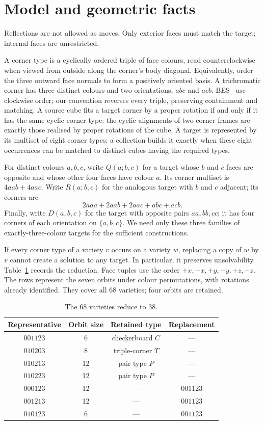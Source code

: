 \documentclass[11pt]{article}
\theoremstyle{remark}
\begin{document}
\section{Model and geometric facts}
Reflections are not allowed as moves. Only exterior faces must match the
target; internal faces are unrestricted.

A corner type is a cyclically ordered triple of face colours, read
counterclockwise when viewed from outside along the corner's body diagonal.
Equivalently, order the three outward face normals to form a positively
oriented basis. A trichromatic corner has three distinct colours and two
orientations, $abc$ and $acb$. BES~\cite[Section 2]{BES} use clockwise order; our convention
reverses every triple, preserving containment and matching. A source cube
fits a target corner by a proper rotation if and
only if it has the same cyclic corner type: the cyclic alignments of two
corner frames are exactly those realised by proper rotations of the cube.
A target is represented by its
multiset of eight corner types: a collection builds it exactly when these
eight occurrences can be matched to distinct cubes having the required types.

For distinct colours $a,b,c$, write $Q(a;b,c)$ for a target whose $b$ and $c$
faces are opposite and whose other four faces have colour $a$. Its corner multiset is
$4aab+4aac$. Write $R(a;b,c)$ for the analogous target with $b$ and $c$
adjacent; its corners are
\[
  2aaa+2aab+2aac+abc+acb.
\]
Finally, write $D(a,b,c)$ for the target with opposite pairs $aa,bb,cc$;
it has four corners of each orientation on $\{a,b,c\}$. We need only these three families of
exactly-three-colour targets for the sufficient constructions.

If every corner type of a variety $v$ occurs on a variety $w$, replacing a
copy of $w$ by $v$ cannot create a solution to any target. In particular, it
preserves unsolvability. Table~\ref{tab:reduction} records the reduction.
Face tuples use the order
$+x,-x,+y,-y,+z,-z$. The rows represent the seven orbits under colour
permutations, with rotations already identified. They cover all 68 varieties;
four orbits are retained.

\begin{table}[ht]
\centering
\begin{tabular}{cccc}
\toprule
Representative & Orbit size & Retained type & Replacement\\
\midrule
$001123$ & 6  & checkerboard $C$ & ---\\
$010203$ & 8  & triple-corner $T$ & ---\\
$010213$ & 12 & pair type $P$ & ---\\
$010223$ & 12 & pair type $P$ & ---\\
\midrule
$000123$ & 12 & --- & $001123$\\
$001213$ & 12 & --- & $001123$\\
$010123$ & 6  & --- & $001123$\\
\bottomrule
\end{tabular}
\caption{The 68 varieties reduce to 38.}
\label{tab:reduction}
\end{table}
\end{document}
